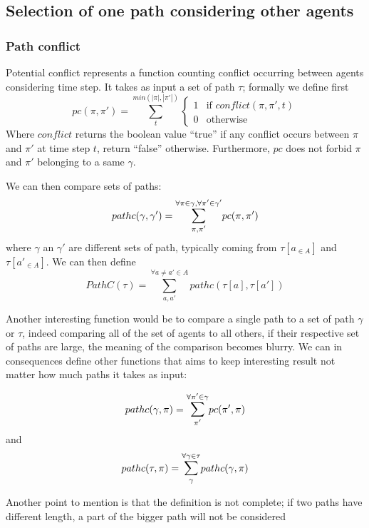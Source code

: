 \subsection{Selection of one path considering other agents}

\subsubsection{Path conflict}
Potential conflict represents a function counting conflict occurring between agents considering time step. It takes as input a set of path \(\tau\); formally we define first \[
    pc(\pi,\pi') =   \sum_{t}^{min(|\pi|,|\pi'|)}{
        \begin{cases}
            1   & \text{if  } conflict(\pi,\pi',t) \\
            0   & \text{otherwise}
        \end{cases}
    }
\] Where \(conflict\) returns the boolean value ``true'' if any conflict occurs between \(\pi\) and \(\pi'\) at time step \(t\), return ``false'' otherwise. Furthermore, \(pc\) does not forbid \(\pi\) and \(\pi'\) belonging to a same \(\gamma\).

We can then compare sets of paths:
\[ 
  pathc(\gamma,\gamma') = \mathlarger{\sum}_{\pi,\pi'}^{\forall \pi \in \gamma,\forall \pi' \in \gamma'}{
        pc(\pi,\pi')
    }
\] where \(\gamma\) an \(\gamma'\) are different sets of path, typically coming from \(\tau[a_{\in A}]\) and \(\tau[a'_{\in A}]\). We can then define \[
    PathC(\tau)= \sum_{a,a'}^{\forall a \neq a' \in A}{
        pathc(\tau[a],\tau[a'])
    }
\]

Another interesting function would be to compare a single path to a set of path \(\gamma\) or \(\tau\), indeed comparing all of the set of agents to all others, if their respective set of paths are large, the meaning of the comparison becomes blurry. We can in consequences define other functions that aims to keep interesting result not matter how much paths it takes as input:

\[ 
  pathc(\gamma,\pi) = \mathlarger{\sum}_{\pi'}^{\forall \pi' \in \gamma}{
        pc(\pi',\pi)
    }
\] and \[ 
    pathc(\tau,\pi) = \mathlarger{\sum}_{\gamma}^{\forall \gamma \in \tau}{
        pathc(\gamma,\pi)
    }
\]

Another point to mention is that the definition is not complete; if two paths have different length, a part of the bigger path will not be considered

